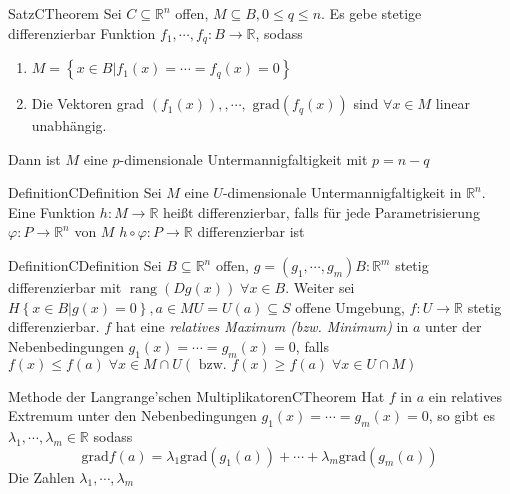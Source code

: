 \begin{ibox}[51]{Satz}{CTheorem}
    Sei $ C \subseteq \mathbb{R}^n  $ offen, $ M \subseteq B, 0 \leq q \leq n $. Es gebe stetige differenzierbar Funktion 
		$ f_1 , \cdots,  f_{q}: B \to \mathbb{R}  $, sodass 
		\begin{enumerate}
			\item $ M = \left\{ x \in B | f_1 (x)  = \cdots = f_{q} (x)  = 0 \right\}  $ 
			\item Die Vektoren grad $ \left( f_1 (x)  \right) , , \cdots, \text{ grad} \left( f_{q} (x)  \right)   $ sind $ \forall x \in M $ 
				linear unabhängig.
		\end{enumerate}
	Dann ist $ M $ eine $ p$-dimensionale Untermannigfaltigkeit mit $ p = n -q $ 	
\end{ibox}
\begin{ibox}[]{Definition}{CDefinition}
    Sei $ M $ eine $ U $-dimensionale Untermannigfaltigkeit in $ \mathbb{R}^n $. Eine Funktion $ h : M \to \mathbb{R} $ heißt 
		differenzierbar, falls für jede Parametrisierung $ \varphi : P \to \mathbb{R}^n $ von $ M $ $ h \circ \varphi : P \to \mathbb{R} $ 
		differenzierbar ist
\end{ibox}

\begin{ibox}[]{Definition}{CDefinition}
    Sei $ B \subseteq \mathbb{R}^n $ offen, $ g = \left( g_1 , \cdots,  g_{m} \right) B : \mathbb{R}^m $ stetig differenzierbar mit 
		$ \operatorname{rang} \left( Dg (x)  \right) \; \forall x \in B $. Weiter sei $ H \left\{ x \in B | g (x)  = 0\right\}, a \in M  
		U = U (a) \subseteq S$ offene Umgebung, $ f: U \to \mathbb{R} $ stetig differenzierbar. $ f $ hat eine \textit{relatives Maximum (bzw.
		Minimum)} in $ a $ unter der Nebenbedingungen $ g_1 (x)  = \cdots = g_{m} (x)  = 0 	$, falls $ f (x) \leq f (a) \; \forall x 
		\in M \cap U  (\text{ bzw. } f (x) \geq f (a) \; \forall x \in U \cap M ) $ 

\end{ibox}

\begin{ibox}[52]{Methode der Langrange'schen Multiplikatoren}{CTheorem}
   Hat $ f $ in $ a $ ein relatives Extremum unter den Nebenbedingungen $ g_1 (x)  = \cdots = g_{m} (x)  = 0 $, so gibt es 
	 $ \lambda_1 , \cdots,  \lambda_m \in \mathbb{R}  $ sodass 
	 \begin{equation}
		 \text{grad} f (a) = \lambda_1 \text{grad} (g_1 (a) ) + \cdots + \lambda_m \text{grad} (g_m (a) )
		 \tag{$\star$}
	 \end{equation}
	Die Zahlen $ \lambda_1 , \cdots,  \lambda_{m} $  
\end{ibox}

%

